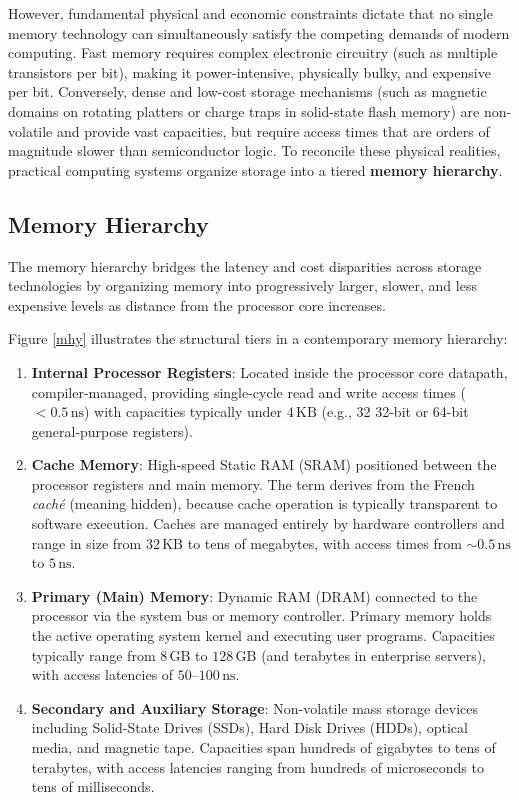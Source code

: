 However, fundamental physical and economic constraints dictate that no single memory technology can simultaneously satisfy the competing demands of modern computing. Fast memory requires complex electronic circuitry (such as multiple transistors per bit), making it power-intensive, physically bulky, and expensive per bit. Conversely, dense and low-cost storage mechanisms (such as magnetic domains on rotating platters or charge traps in solid-state flash memory) are non-volatile and provide vast capacities, but require access times that are orders of magnitude slower than semiconductor logic. To reconcile these physical realities, practical computing systems organize storage into a tiered \textbf{memory hierarchy}.

\subsection{Memory Hierarchy}\label{memhier}

The memory hierarchy bridges the latency and cost disparities across storage technologies by organizing memory into progressively larger, slower, and less expensive levels as distance from the processor core increases. 

Figure \ref{mhy} illustrates the structural tiers in a contemporary memory hierarchy:
\begin{enumerate}
    \item \textbf{Internal Processor Registers}: Located inside the processor core datapath, compiler-managed, providing single-cycle read and write access times ($< 0.5\,\text{ns}$) with capacities typically under $4\,\text{KB}$ (e.g., 32 32-bit or 64-bit general-purpose registers).
    \item \textbf{Cache Memory}: High-speed Static RAM (SRAM) positioned between the processor registers and main memory. The term derives from the French \emph{cach\'e} (meaning hidden), because cache operation is typically transparent to software execution. Caches are managed entirely by hardware controllers and range in size from $32\,\text{KB}$ to tens of megabytes, with access times from $\sim 0.5\,\text{ns}$ to $5\,\text{ns}$.
    \item \textbf{Primary (Main) Memory}: Dynamic RAM (DRAM) connected to the processor via the system bus or memory controller. Primary memory holds the active operating system kernel and executing user programs. Capacities typically range from $8\,\text{GB}$ to $128\,\text{GB}$ (and terabytes in enterprise servers), with access latencies of $50\text{--}100\,\text{ns}$.
    \item \textbf{Secondary and Auxiliary Storage}: Non-volatile mass storage devices including Solid-State Drives (SSDs), Hard Disk Drives (HDDs), optical media, and magnetic tape. Capacities span hundreds of gigabytes to tens of terabytes, with access latencies ranging from hundreds of microseconds to tens of milliseconds.
\end{enumerate}

